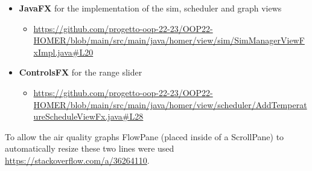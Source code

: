 \begin{itemize}
\begin{itemize}
    \end{itemize}
    \item \textbf{JavaFX} for the implementation of the sim, scheduler and graph views
    \begin{itemize}
        \item \url{https://github.com/progetto-oop-22-23/OOP22-HOMER/blob/main/src/main/java/homer/view/sim/SimManagerViewFxImpl.java#L20}
    \end{itemize}
    \item \textbf{ControlsFX} for the range slider
    \begin{itemize}
        \item \url{https://github.com/progetto-oop-22-23/OOP22-HOMER/blob/main/src/main/java/homer/view/scheduler/AddTemperatureScheduleViewFx.java#L28}
    \end{itemize}
\end{itemize}

To allow the air quality graphs FlowPane (placed inside of a ScrollPane) to automatically resize these two lines were used \url{https://stackoverflow.com/a/36264110}.
